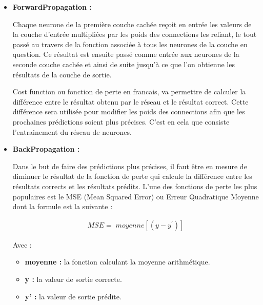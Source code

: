             \begin{itemize}[label=•] %
            \setlength{\itemsep}{5pt}
            
                \item \textbf{ForwardPropagation :} 
                \par Chaque neurone de la première couche cachée reçoit en entrée les valeurs de la couche d'entrée multipliées par les poids des connections les reliant, le tout passé au travers de la fonction associée à tous les neurones de la couche en question. Ce résultat est ensuite passé comme entrée aux neurones de la seconde couche cachée et ainsi de suite jusqu'à ce que l'on obtienne les résultats de la couche de sortie.\\
                
                \par Cost function ou  fonction de perte en francais, va permettre de calculer la différence entre le résultat obtenu par le réseau et le résultat correct. Cette différence sera utilisée pour modifier les poids des connections afin que les prochaines prédictions soient plus précises. C’est en cela que consiste l’entrainement du réseau de neurones. \\
        
                \item \textbf{BackPropagation :} 
                \par Dans le but de faire des prédictions plus précises, il faut être en mesure de diminuer le résultat de la fonction de perte qui calcule la différence entre les résultats corrects et les résultats prédits. L'une des fonctions de perte les plus populaires est le MSE (Mean Squared Error) ou Erreur Quadratique Moyenne dont la formule est la suivante : 
                
                \begin{gather*}
                    MSE = \;  moyenne [ ( y - y^\prime ) ]
                \end{gather*}
                
                \par Avec :
                    \begin{itemize}[label=-] %
                    \setlength{\itemsep}{5pt}
                        \item \textbf{moyenne :}  la fonction calculant la moyenne arithmétique.
                        \item \textbf{y :} la valeur de sortie correcte.
                        \item \textbf{y’ :} la valeur de sortie prédite.\\
                    \end{itemize}
                

\end{itemize}
